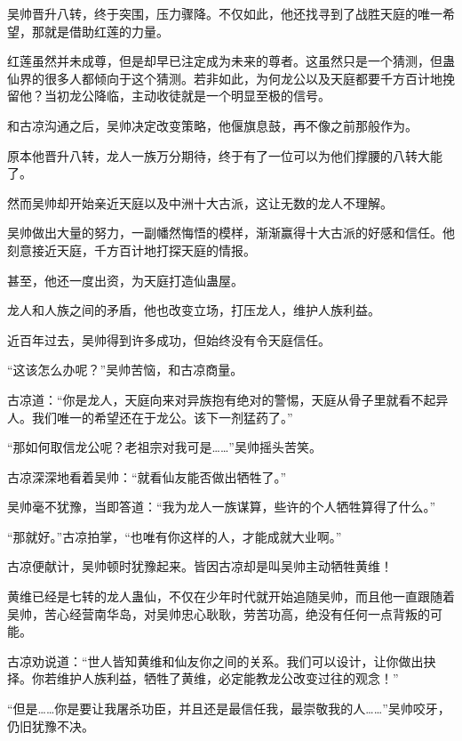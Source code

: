 
\begin{this_body}

吴帅晋升八转，终于突围，压力骤降。不仅如此，他还找寻到了战胜天庭的唯一希望，那就是借助红莲的力量。

红莲虽然并未成尊，但是却早已注定成为未来的尊者。这虽然只是一个猜测，但蛊仙界的很多人都倾向于这个猜测。若非如此，为何龙公以及天庭都要千方百计地挽留他？当初龙公降临，主动收徒就是一个明显至极的信号。

和古凉沟通之后，吴帅决定改变策略，他偃旗息鼓，再不像之前那般作为。

原本他晋升八转，龙人一族万分期待，终于有了一位可以为他们撑腰的八转大能了。

然而吴帅却开始亲近天庭以及中洲十大古派，这让无数的龙人不理解。

吴帅做出大量的努力，一副幡然悔悟的模样，渐渐赢得十大古派的好感和信任。他刻意接近天庭，千方百计地打探天庭的情报。

甚至，他还一度出资，为天庭打造仙蛊屋。

龙人和人族之间的矛盾，他也改变立场，打压龙人，维护人族利益。

近百年过去，吴帅得到许多成功，但始终没有令天庭信任。

“这该怎么办呢？”吴帅苦恼，和古凉商量。

古凉道：“你是龙人，天庭向来对异族抱有绝对的警惕，天庭从骨子里就看不起异人。我们唯一的希望还在于龙公。该下一剂猛药了。”

“那如何取信龙公呢？老祖宗对我可是……”吴帅摇头苦笑。

古凉深深地看着吴帅：“就看仙友能否做出牺牲了。”

吴帅毫不犹豫，当即答道：“我为龙人一族谋算，些许的个人牺牲算得了什么。”

“那就好。”古凉拍掌，“也唯有你这样的人，才能成就大业啊。”

古凉便献计，吴帅顿时犹豫起来。皆因古凉却是叫吴帅主动牺牲黄维！

黄维已经是七转的龙人蛊仙，不仅在少年时代就开始追随吴帅，而且他一直跟随着吴帅，苦心经营南华岛，对吴帅忠心耿耿，劳苦功高，绝没有任何一点背叛的可能。

古凉劝说道：“世人皆知黄维和仙友你之间的关系。我们可以设计，让你做出抉择。你若维护人族利益，牺牲了黄维，必定能教龙公改变过往的观念！”

“但是……你是要让我屠杀功臣，并且还是最信任我，最崇敬我的人……”吴帅咬牙，仍旧犹豫不决。


\end{this_body}
